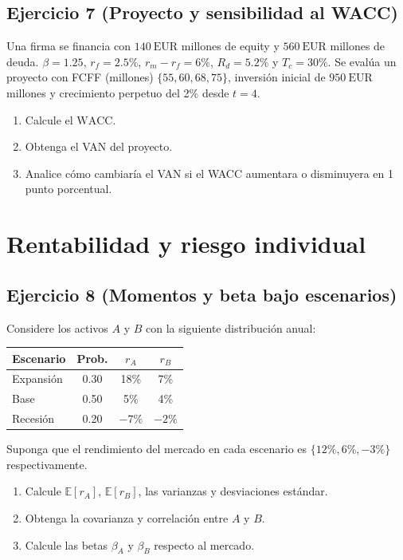 \documentclass[12pt,a4paper]{article}
\newcommand{\E}{\mathbb{E}}
\newcommand{\EUR}[1]{\ensuremath{#1~\text{EUR}}}
\newenvironment{ejercicio}[1]{\subsection*{Ejercicio #1}}{}
\begin{document}
\begin{ejercicio}{7 (Proyecto y sensibilidad al WACC)}
Una firma se financia con \EUR{140} millones de equity y \EUR{560} millones de deuda. $\beta=1.25$, $r_f=2.5\%$, $r_m-r_f=6\%$, $R_d=5.2\%$ y $T_c=30\%$. Se evalúa un proyecto con FCFF (millones) $\{55,60,68,75\}$, inversión inicial de \EUR{950} millones y crecimiento perpetuo del 2\% desde $t=4$.
\begin{enumerate}[label=\alph*)]
  \item Calcule el $\text{WACC}$.
  \item Obtenga el VAN del proyecto.
  \item Analice cómo cambiaría el VAN si el WACC aumentara o disminuyera en 1 punto porcentual.
\end{enumerate}
\end{ejercicio}

\section{Rentabilidad y riesgo individual}

\begin{ejercicio}{8 (Momentos y beta bajo escenarios)}
Considere los activos $A$ y $B$ con la siguiente distribución anual:
\begin{center}
\begin{tabular}{lccc}
\toprule
Escenario & Prob. & $r_A$ & $r_B$ \\
\midrule
Expansión & 0.30 & 18\% & 7\% \\
Base & 0.50 & 5\% & 4\% \\
Recesión & 0.20 & $-7\%$ & $-2\%$ \\
\bottomrule
\end{tabular}
\end{center}
Suponga que el rendimiento del mercado en cada escenario es $\{12\%, 6\%, -3\%\}$ respectivamente.
\begin{enumerate}[label=\alph*)]
  \item Calcule $\E[r_A]$, $\E[r_B]$, las varianzas y desviaciones estándar.
  \item Obtenga la covarianza y correlación entre $A$ y $B$.
  \item Calcule las betas $\beta_A$ y $\beta_B$ respecto al mercado.
\end{enumerate}
\end{ejercicio}
\end{document}
